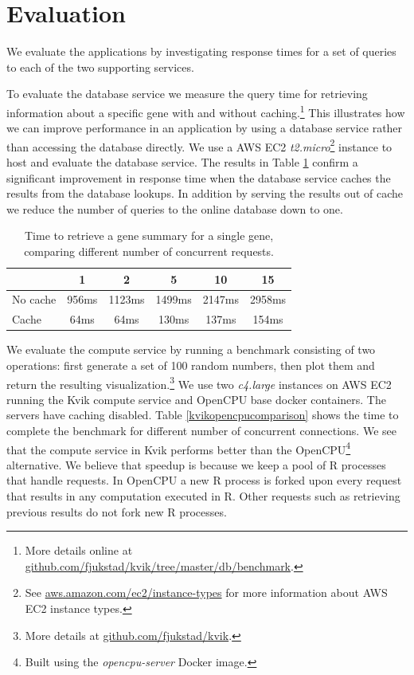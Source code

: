 \section{Evaluation} 
We evaluate the applications by investigating response times for a set of queries
to each of the two supporting services. 

To evaluate the database service we measure the query time for retrieving
information about a specific gene with and without caching.\footnote{More
details online at \url{github.com/fjukstad/kvik/tree/master/db/benchmark}.} This
illustrates how we can improve performance in an application by using a database
service rather than accessing the database directly. 
We use a AWS EC2 \emph{t2.micro}\footnote{See
\url{aws.amazon.com/ec2/instance-types} for more information about AWS EC2
instance types.} instance to host and evaluate the database service.  The
results in Table \ref{db} confirm a significant improvement in response time
when the database service caches the results from the database lookups. In
addition by serving the results out of cache we reduce the number of queries to
the online database down to one. 

\begin{table}[h]
    \caption{Time to retrieve a gene summary for a single gene, comparing
    different number of concurrent requests.}
    \begin{tabular}{| l | c | c | c | c | c | }
        \hline 
        & 1 & 2 & 5 & 10 & 15 \\ 
      \hline			
      No cache & 956ms & 1123ms & 1499ms & 2147ms & 2958ms\\
      \hline
      Cache & 64ms & 64ms & 130ms & 137ms & 154ms\\
      \hline  
    \end{tabular}
\label{db}
\end{table} 

We evaluate the compute service by running a benchmark consisting of two
operations: first generate a set of 100 random numbers, then plot them and
return the resulting visualization.\footnote{More details at
\url{github.com/fjukstad/kvik}.} We use two \emph{c4.large} instances on AWS EC2
running the Kvik compute service and OpenCPU base docker containers. The servers
have caching disabled.  Table \ref{kvikopencpucomparison} shows the time to
complete the benchmark for different number of concurrent connections. We see
that the compute service in Kvik performs better than the OpenCPU\footnote{Built
using the \textit{opencpu-server} Docker image.} alternative. We believe that
speedup is because we keep a pool of R processes that handle requests. In
OpenCPU a new R process is forked upon every request that results in any
computation executed in R. Other requests such as retrieving previous results do
not fork new R processes. 

